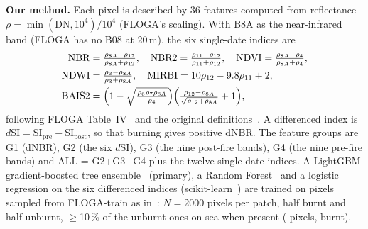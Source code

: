 \textbf{Our method.} Each pixel is described by 36 features computed from reflectance
$\rho=\min(\mathrm{DN},10^4)/10^4$ (FLOGA's scaling). With B8A as the near-infrared band (FLOGA has no B08 at
20\,m), the six single-date indices are
\begin{align}
\mathrm{NBR}&=\tfrac{\rho_{8A}-\rho_{12}}{\rho_{8A}+\rho_{12}}, \quad
\mathrm{NBR2}=\tfrac{\rho_{11}-\rho_{12}}{\rho_{11}+\rho_{12}}, \quad
\mathrm{NDVI}=\tfrac{\rho_{8A}-\rho_{4}}{\rho_{8A}+\rho_{4}}, \nonumber\\
\mathrm{NDWI}&=\tfrac{\rho_{3}-\rho_{8A}}{\rho_{3}+\rho_{8A}}, \quad
\mathrm{MIRBI}=10\rho_{12}-9.8\rho_{11}+2, \nonumber\\
\mathrm{BAIS2}&=\Bigl(1-\sqrt{\tfrac{\rho_{6}\rho_{7}\rho_{8A}}{\rho_{4}}}\Bigr)
\Bigl(\tfrac{\rho_{12}-\rho_{8A}}{\sqrt{\rho_{12}+\rho_{8A}}}+1\Bigr),
\end{align}
following FLOGA Table~IV~\cite{sdraka2024floga} and the original
definitions~\cite{key2006landscape,mcfeeters1996ndwi,filipponi2018bais2,trigg2001mirbi}. A differenced index is
$d\mathrm{SI}=\mathrm{SI}_\mathrm{pre}-\mathrm{SI}_\mathrm{post}$, so that burning gives positive dNBR. The feature
groups are G1 (dNBR), G2 (the six $d\mathrm{SI}$), G3 (the nine post-fire bands), G4 (the nine pre-fire bands) and
ALL = G2+G3+G4 plus the twelve single-date indices. A LightGBM gradient-boosted tree ensemble~\cite{ke2017lightgbm}
(primary), a Random Forest~\cite{breiman2001rf} and a logistic regression on the six differenced indices
(scikit-learn~\cite{pedregosa2011sklearn}) are trained on pixels sampled from FLOGA-train as in~\cite{sdraka2024floga}:
$N=2000$ pixels per patch, half burnt and half unburnt, $\geq$10\,\% of the unburnt ones on sea when present
(\SamplesTrain{} pixels, \SamplesBurntTrain{} burnt).

\begin{table}[t]
\centering
\caption{Hyper-parameter search spaces (Optuna TPE, objective: F1 on FLOGA validation).}\label{tab:hpo}
\end{table}

